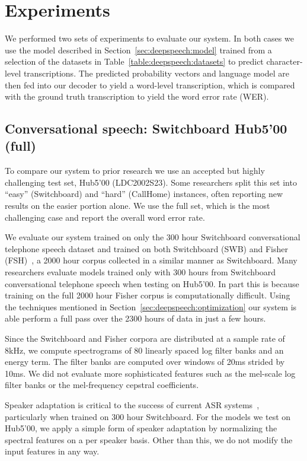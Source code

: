 \section{Experiments}
\label{sec:deepspeech:experiments}

We performed two sets of experiments to evaluate our system. In both cases we
use the model described in Section~\ref{sec:deepspeech:model} trained from a
selection of the datasets in Table~\ref{table:deepspeech:datasets} to predict
character-level transcriptions. The predicted probability vectors and language
model are then fed into our decoder to yield a word-level transcription, which
is compared with the ground truth transcription to yield the word error rate
(WER).

\subsection{Conversational speech: Switchboard Hub5'00 (full)}

To compare our system to prior research we use an accepted but highly
challenging test set, Hub5'00 (LDC2002S23). Some researchers split this set
into ``easy'' (Switchboard) and ``hard'' (CallHome) instances, often reporting
new results on the easier portion alone. We use the full set, which is the most
challenging case and report the overall word error rate.

We evaluate our system trained on only the 300 hour Switchboard conversational
telephone speech dataset and trained on both Switchboard (SWB) and Fisher
(FSH)~\cite{cieri2004fisher}, a 2000 hour corpus collected in a similar manner
as Switchboard. Many researchers evaluate models trained only with 300 hours
from Switchboard conversational telephone speech when testing on Hub5'00. In
part this is because training on the full 2000 hour Fisher corpus is
computationally difficult. Using the techniques mentioned in
Section~\ref{sec:deepspeech:optimization} our system is able perform a full
pass over the 2300 hours of data in just a few hours.

Since the Switchboard and Fisher corpora are distributed at a sample rate of
8kHz, we compute spectrograms of 80 linearly spaced log filter banks and an
energy term.  The filter banks are computed over windows of 20ms strided by
10ms. We did not evaluate more sophisticated features such as the mel-scale log
filter banks or the mel-frequency cepstral coefficients.

Speaker adaptation is critical to the success of current ASR
systems~\cite{vesely2013, sainath2013deep}, particularly when trained on 300
hour Switchboard. For the models we test on Hub5'00, we apply a simple form of
speaker adaptation by normalizing the spectral features on a per speaker basis.
Other than this, we do not modify the input features in any way.

